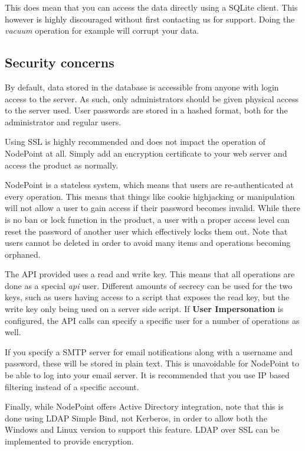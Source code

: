 \documentclass[11pt]{article}
\begin{document}
This does mean that you can access the data directly using a SQLite client. This however is highly discouraged without first contacting us for support. Doing the \textit{vacuum} operation for example will corrupt your data.

\subsection{Security concerns}
By default, data stored in the database is accessible from anyone with login access to the server. As such, only administrators should be given physical access to the server used. User passwords are stored in a hashed format, both for the administrator and regular users.

Using SSL is highly recommended and does not impact the operation of NodePoint at all. Simply add an encryption certificate to your web server and access the product as normally.

NodePoint is a stateless system, which means that users are re-authenticated at every operation. This means that things like cookie highjacking or manipulation will not allow a user to gain access if their password becomes invalid. While there is no ban or lock function in the product, a user with a proper access level can reset the password of another user which effectively locks them out. Note that users cannot be deleted in order to avoid many items and operations becoming orphaned.

The API provided uses a read and write key. This means that all operations are done as a special \textit{api} user. Different amounts of secrecy can be used for the two keys, such as users having access to a script that exposes the read key, but the write key only being used on a server side script. If \textbf{User Impersonation} is configured, the API calls can specify a specific user for a number of operations as well.

If you specify a SMTP server for email notifications along with a username and password, these will be stored in plain text. This is unavoidable for NodePoint to be able to log into your email server. It is recommended that you use IP based filtering instead of a specific account.

Finally, while NodePoint offers Active Directory integration, note that this is done using LDAP Simple Bind, not Kerberos, in order to allow both the Windows and Linux version to support this feature. LDAP over SSL can be implemented to provide encryption.
\end{document}
